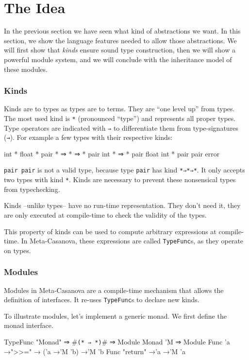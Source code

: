 \section{The Idea}
In the previous section we have seen what kind of abstractions we want.
In this section, we show the language features needed to allow those abstractions.
We will first show that \textit{kinds} ensure sound type construction,
then we will show a powerful module system,
and we will conclude with the inheritance model of these modules.

\subsubsection*{Kinds}
Kinds are to types as types are to terms.\cite[Chapter~30]{Pierce02}
They are ``one level up'' from types.
The most used kind is \texttt{*} (pronounced ``type'') and represents all proper types.
Type operators are indicated with \texttt{⇒} to differentiate them from type-signatures (\texttt{→}).
For example a few types with their respective kinds:
\begin{code}
  int             *
  float           *
  pair            * ⇒ * ⇒ *
  pair int        * ⇒ * 
  pair float int  *
  pair pair       error
\end{code}

\texttt{pair pair} is not a valid type, because type \texttt{pair} has kind \texttt{*⇒*⇒*}.
It only accepts two types with kind \texttt{*}.
Kinds are necessary to prevent these nonsensical types from typechecking.

Kinds --unlike types-- have no run-time representation.
They don't need it, they are only executed at compile-time to check the validity of the types.

This property of kinds can be used to compute arbitrary expressions at compile-time.
In Meta-Casanova, these expressions are called \texttt{TypeFunc}s, as they operate on types.

\subsubsection*{Modules}
Modules in Meta-Casanova are a compile-time mechanism that allows the definition of interfaces.
It re-uses \texttt{TypeFunc}s to declare new kinds.

To illustrate modules, let's implement a generic monad.
We first define the monad interface.

\begin{code}
  TypeFunc "Monad" ⇒ #\verb|(* ⇒ *)|# ⇒ Module
  Monad 'M ⇒ Module {
    Func 'a →">>=" → ('a →'M 'b) →'M 'b
    Func "return" →'a →'M 'a
  }
\end{code}


